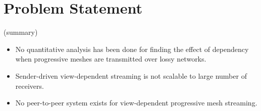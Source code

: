 \documentclass[11pt, a4paper]{report}
\begin{document}
    \section{Problem Statement}
    \label{s:intro:problem}
    (summary)
    \begin{itemize}
        \item No quantitative analysis has been done for 
            finding the effect of dependency 
            when progressive meshes are transmitted over lossy networks. 
        \item Sender-driven view-dependent streaming
            is not scalable to large number of receivers. 
        \item No peer-to-peer system 
            exists for view-dependent progressive mesh streaming. 
    \end{itemize}
    
\end{document}
